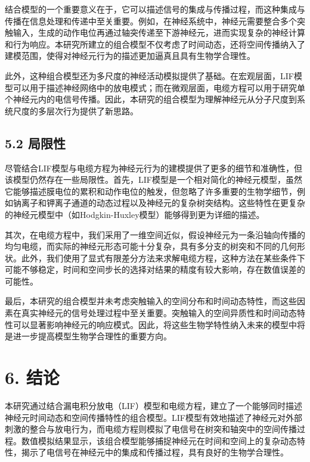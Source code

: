 \documentclass[12pt]{article}
\begin{document}
结合模型的一个重要意义在于，它可以描述信号的集成与传播过程，而这种集成与传播在信息处理和传递中至关重要。例如，在神经系统中，神经元需要整合多个突触输入，生成的动作电位再通过轴突传递至下游神经元，进而实现复杂的神经计算和行为响应。本研究所建立的组合模型不仅考虑了时间动态，还将空间传播纳入了建模范围，使得对神经元行为的描述更加逼真且具有生物学合理性。

此外，这种组合模型还为多尺度的神经活动模拟提供了基础。在宏观层面，LIF模型可以用于描述神经网络中的放电模式；而在微观层面，电缆方程可以用于研究单个神经元内的电信号传播。因此，本研究的组合模型为理解神经元从分子尺度到系统尺度的多层次行为提供了新思路。

\subsection*{5.2 局限性}

尽管结合LIF模型与电缆方程为神经元行为的建模提供了更多的细节和准确性，但该模型仍然存在一些局限性。首先，LIF模型是一个相对简化的神经元模型，虽然它能够描述膜电位的累积和动作电位的触发，但忽略了许多重要的生物学细节，例如钠离子和钾离子通道的动态过程以及神经元的复杂树突结构。这些特性在更复杂的神经元模型中（如Hodgkin-Huxley模型）能够得到更为详细的描述。

其次，在电缆方程中，我们采用了一维空间近似，假设神经元为一条沿轴向传播的均匀电缆，而实际的神经元形态可能十分复杂，具有多分支的树突和不同的几何形状。此外，我们使用了显式有限差分方法来求解电缆方程，这种方法在某些条件下可能不够稳定，时间和空间步长的选择对结果的精度有较大影响，存在数值误差的可能性。

最后，本研究的组合模型并未考虑突触输入的空间分布和时间动态特性，而这些因素在真实神经元的信号处理过程中至关重要。突触输入的空间异质性和时间动态特性可以显著影响神经元的响应模式。因此，将这些生物学特性纳入未来的模型中将是进一步提高模型生物学合理性的重要方向。

\section*{6. \textbf{结论}}

本研究通过结合漏电积分放电（LIF）模型和电缆方程，建立了一个能够同时描述神经元时间动态和空间传播特性的组合模型。LIF模型有效地描述了神经元对外部刺激的整合与放电行为，而电缆方程则模拟了电信号在树突和轴突中的空间传播过程。数值模拟结果显示，该组合模型能够捕捉神经元在时间和空间上的复杂动态特性，揭示了电信号在神经元中的集成和传播过程，具有良好的生物学合理性。
\end{document}
